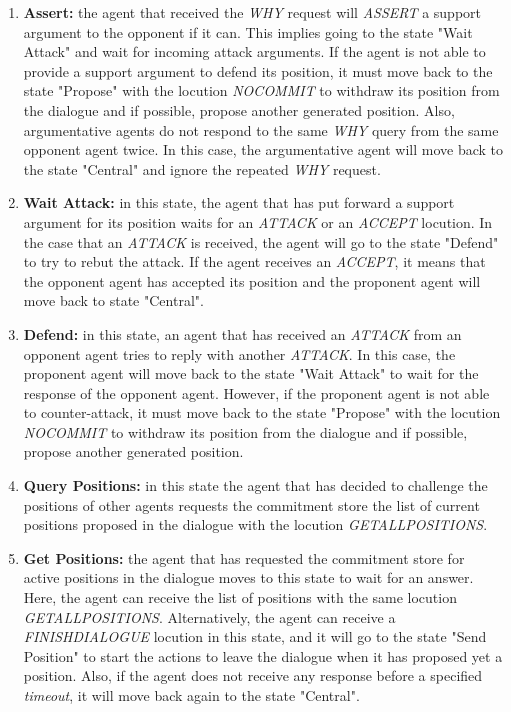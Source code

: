 \begin{enumerate}
 \item \textbf{Assert:} the agent that received the \emph{WHY} request will \emph{ASSERT} a support argument to the opponent if it can. This implies going to the state "Wait Attack" and wait for incoming attack arguments. If the agent is not able to provide a support argument to defend its position, it must move back to the state "Propose" with the locution \emph{NOCOMMIT} to withdraw its position from the dialogue and if possible, propose another generated position. Also, argumentative agents do not respond to the same \emph{WHY} query from the same opponent agent twice. In this case, the argumentative agent will move back to the state "Central" and ignore the repeated \emph{WHY} request.
 \item \textbf{Wait Attack:} in this state, the agent that has put forward a support argument for its position waits for an \emph{ATTACK} or an \emph{ACCEPT} locution. In the case that an \emph{ATTACK} is received, the agent will go to the state "Defend" to try to rebut the attack. If the agent receives an \emph{ACCEPT}, it means that the opponent agent has accepted its position and the proponent agent will move back to state "Central".
 \item \textbf{Defend:} in this state, an agent that has received an \emph{ATTACK} from an opponent agent tries to reply with another \emph{ATTACK}. In this case, the proponent agent will move back to the state "Wait Attack" to wait for the response of the opponent agent. However, if the proponent agent is not able to counter-attack, it must move back to the state "Propose" with the locution \emph{NOCOMMIT} to withdraw its position from the dialogue and if possible, propose another generated position.
 \item \textbf{Query Positions:} in this state the agent that has decided to challenge the positions of other agents requests the commitment store the list of current positions proposed in the dialogue with the locution \emph{GETALLPOSITIONS}.
 \item \textbf{Get Positions:} the agent that has requested the commitment store for active positions in the dialogue moves to this state to wait for an answer. Here, the agent can receive the list of positions with the same locution \emph{GETALLPOSITIONS}. Alternatively, the agent can receive a \emph{FINISHDIALOGUE} locution in this state, and it will go to the state "Send Position" to start the actions to leave the dialogue when it has proposed yet a position. Also, if the agent does not receive any response before a specified \emph{timeout}, it will move back again to the state "Central".

\end{enumerate}
